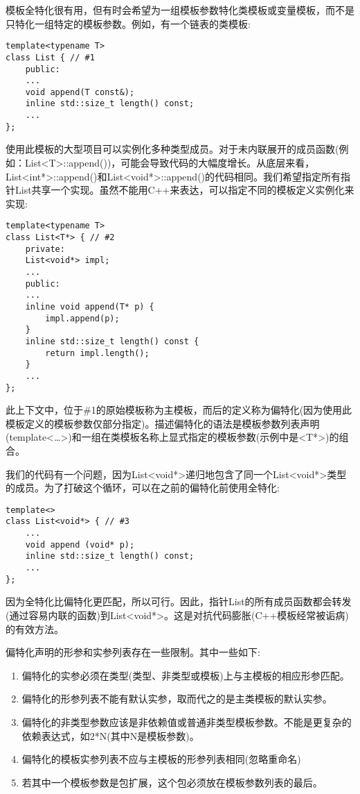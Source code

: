 
模板全特化很有用，但有时会希望为一组模板参数特化类模板或变量模板，而不是只特化一组特定的模板参数。例如，有一个链表的类模板:

\begin{lstlisting}[style=styleCXX]
template<typename T>
class List { // #1
	public:
	...
	void append(T const&);
	inline std::size_t length() const;
	...
};
\end{lstlisting}

使用此模板的大型项目可以实例化多种类型成员。对于未内联展开的成员函数(例如：List<T>::append())，可能会导致代码的大幅度增长。从底层来看，List<int*>::append()和List<void*>::append()的代码相同。我们希望指定所有指针List共享一个实现。虽然不能用C++来表达，可以指定不同的模板定义实例化来实现:

\begin{lstlisting}[style=styleCXX]
template<typename T>
class List<T*> { // #2
	private:
	List<void*> impl;
	...
	public:
	...
	inline void append(T* p) {
		impl.append(p);
	}
	inline std::size_t length() const {
		return impl.length();
	}
	...
};
\end{lstlisting}

此上下文中，位于\#1的原始模板称为主模板，而后的定义称为偏特化(因为使用此模板定义的模板参数仅部分指定)。描述偏特化的语法是模板参数列表声明(template<…>)和一组在类模板名称上显式指定的模板参数(示例中是<T*>)的组合。

我们的代码有一个问题，因为List<void*>递归地包含了同一个List<void*>类型的成员。为了打破这个循环，可以在之前的偏特化前使用全特化:

\begin{lstlisting}[style=styleCXX]
template<>
class List<void*> { // #3
	...
	void append (void* p);
	inline std::size_t length() const;
	...
};
\end{lstlisting}

因为全特化比偏特化更匹配，所以可行。因此，指针List的所有成员函数都会转发(通过容易内联的函数)到List<void*>。这是对抗代码膨胀(C++模板经常被诟病)的有效方法。

偏特化声明的形参和实参列表存在一些限制。其中一些如下:

\begin{enumerate}
\item 
偏特化的实参必须在类型(类型、非类型或模板)上与主模板的相应形参匹配。

\item 
偏特化的形参列表不能有默认实参，取而代之的是主类模板的默认实参。

\item 
偏特化的非类型参数应该是非依赖值或普通非类型模板参数。不能是更复杂的依赖表达式，如2*N(其中N是模板参数)。

\item 
偏特化的模板实参列表不应与主模板的形参列表相同(忽略重命名)

\item 
若其中一个模板参数是包扩展，这个包必须放在模板参数列表的最后。
\end{enumerate}


